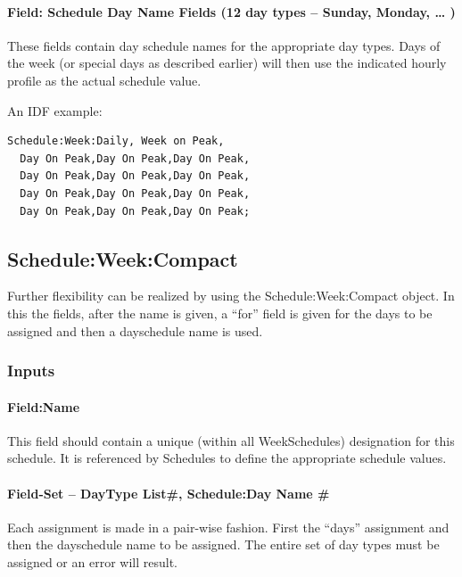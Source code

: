 \paragraph{Field: Schedule Day Name Fields (12 day types -- Sunday, Monday, \ldots{} )}\label{field-schedule-day-name-fields-12-day-types-sunday-monday}

These fields contain day schedule names for the appropriate day types. Days of the week (or special days as described earlier) will then use the indicated hourly profile as the actual schedule value.

An IDF example:

\begin{lstlisting}
Schedule:Week:Daily, Week on Peak,
  Day On Peak,Day On Peak,Day On Peak,
  Day On Peak,Day On Peak,Day On Peak,
  Day On Peak,Day On Peak,Day On Peak,
  Day On Peak,Day On Peak,Day On Peak;
\end{lstlisting}

\subsection{Schedule:Week:Compact}\label{scheduleweekcompact}

Further flexibility can be realized by using the Schedule:Week:Compact object. In this the fields, after the name is given, a ``for'' field is given for the days to be assigned and then a dayschedule name is used.

\subsubsection{Inputs}\label{inputs-5-026}

\paragraph{Field:Name}\label{fieldname}

This field should contain a unique (within all WeekSchedules) designation for this schedule. It is referenced by Schedules to define the appropriate schedule values.

\paragraph{Field-Set -- DayType List\#, Schedule:Day Name \#}\label{field-set-daytype-list-scheduleday-name}

Each assignment is made in a pair-wise fashion. First the ``days'' assignment and then the dayschedule name to be assigned. The entire set of day types must be assigned or an error will result.

